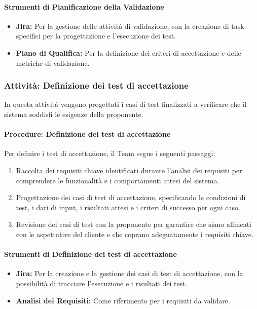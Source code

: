 \documentclass[a4paper,12pt]{article}
\begin{document}
\paragraph{Strumenti di Pianificazione della Validazione}
\begin{itemize}
    \item \textbf{Jira:} Per la gestione delle attività di validazione, con la creazione di task specifici per la progettazione e l'esecuzione dei test.
    \item \textbf{Piano di Qualifica:} Per la definizione dei criteri di accettazione e delle metriche di validazione.
\end{itemize}

\subsubsection{Attività: Definizione dei test di accettazione}
In questa attività vengono progettati i casi di test finalizzati a verificare che il sistema soddisfi le esigenze della proponente.

\paragraph{Procedure: Definizione dei test di accettazione}
Per definire i test di accettazione, il Team segue i seguenti passaggi:
\begin{enumerate}
    \item Raccolta dei requisiti chiave identificati durante l'analisi dei requisiti per comprendere le funzionalità e i comportamenti attesi del sistema.
    \item Progettazione dei casi di test di accettazione, specificando le condizioni di test, i dati di input, i risultati attesi e i criteri di successo per ogni caso.
    \item Revisione dei casi di test con la proponente per garantire che siano allineati con le aspettative del cliente e che coprano adeguatamente i requisiti chiave.
\end{enumerate}

\paragraph{Strumenti di Definizione dei test di accettazione}
\begin{itemize}
    \item \textbf{Jira:} Per la creazione e la gestione dei casi di test di accettazione, con la possibilità di tracciare l'esecuzione e i risultati dei test.
    \item \textbf{Analisi dei Requisiti:} Come riferimento per i requisiti da validare.
\end{itemize}
\end{document}
